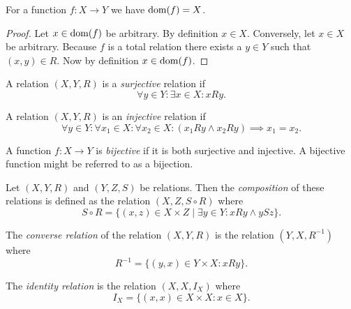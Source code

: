 \documentclass[../../main.tex]{subfiles}
\begin{document}
\begin{theorem}
    For a function $f:X\to Y$ we have $\operatorname{dom}(f)=X$.
\end{theorem}
\begin{proof}
    Let $x\in\operatorname{dom}(f)$ be arbitrary. By definition $x\in X$. Conversely, let $x\in X$ be arbitrary. Because $f$ is a total relation there exists a $y\in Y$ such that $(x,y)\in R$. Now by definition $x\in\operatorname{dom}(f)$.
\end{proof}
\begin{definition}
    A relation $(X,Y,R)$ is a \emph{surjective} relation if
    \begin{equation*}
        \forall y\in Y:\exists x\in X:xRy.
    \end{equation*}
\end{definition}
\begin{definition}
    A relation $(X,Y,R)$ is an \emph{injective} relation if
    \begin{equation*}
        \forall y\in Y:\forall x_1\in X:\forall x_2\in X:(x_1Ry\land x_2Ry)\implies x_1=x_2.
    \end{equation*}
\end{definition}
\begin{definition}
    A function $f:X\to Y$ is \emph{bijective} if it is both surjective and injective. A bijective function might be referred to as a bijection.
\end{definition}
\begin{notation}
    Let $(X,Y,R)$ and $(Y,Z,S)$ be relations. Then the \emph{composition} of these relations is defined as the relation $(X,Z,S\circ R)$ where
    \begin{equation*}
        S\circ R=\{(x,z)\in X\times Z\mid\exists y\in Y:xRy\land ySz\}.
    \end{equation*}
\end{notation}
\begin{definition}
    The \emph{converse relation} of the relation $(X,Y,R)$ is the relation $(Y,X,R^{-1})$ where
    \begin{equation*}
        R^{-1}=\{(y,x)\in Y\times X:xRy\}.
    \end{equation*}
\end{definition}
\begin{definition}
    The \emph{identity relation} is the relation $(X,X,I_X)$ where
    \begin{equation*}
        I_X=\{(x,x)\in X\times X:x\in X\}.
    \end{equation*}
\end{definition}
\end{document}
